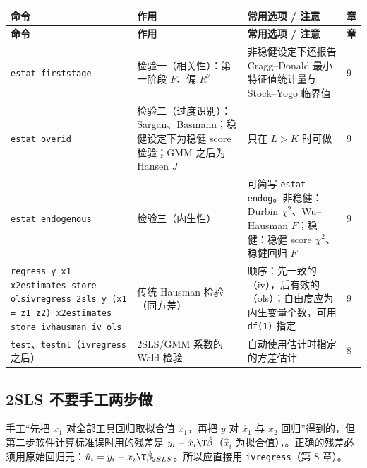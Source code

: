 {\renewcommand{\arraystretch}{1.12}\begin{longtable}{@{}>{\raggedright\arraybackslash\small}p{5.3cm}>{\raggedright\arraybackslash\small}p{3.8cm}>{\raggedright\arraybackslash\small}p{5.3cm}>{\centering\arraybackslash\small}p{0.9cm}@{}}
\toprule
\textbf{命令} & \textbf{作用} & \textbf{常用选项 / 注意} & \textbf{章}\\
\midrule
\endfirsthead
\toprule
\textbf{命令} & \textbf{作用} & \textbf{常用选项 / 注意} & \textbf{章}\\
\midrule
\endhead
\bottomrule
\endlastfoot

\texttt{estat firststage} & 检验一（相关性）：第一阶段 $F$、偏 $R^2$ & 非稳健设定下还报告 Cragg–Donald 最小特征值统计量与 Stock–Yogo 临界值 & 9\\
\addlinespace[1pt]
\texttt{estat overid} & 检验二（过度识别）：Sargan、Basmann；稳健设定下为稳健 score 检验；GMM 之后为 Hansen $J$ & 只在 $L>K$ 时可做 & 9\\
\addlinespace[1pt]
\texttt{estat endogenous} & 检验三（内生性） & 可简写 \texttt{estat endog}。非稳健：Durbin $\chi^2$、Wu–Hausman $F$；稳健：稳健 score $\chi^2$、稳健回归 $F$ & 9\\
\addlinespace[1pt]
\texttt{regress y x1 x2}\newline \texttt{estimates store ols}\newline \texttt{ivregress 2sls y (x1 = z1 z2) x2}\newline \texttt{estimates store iv}\newline \texttt{hausman iv ols} & 传统 Hausman 检验（同方差） & 顺序：先一致的（iv），后有效的（ols）；自由度应为内生变量个数，可用 \texttt{df(1)} 指定 & 9\\
\addlinespace[1pt]
\texttt{test}、\texttt{testnl}（\texttt{ivregress} 之后） & 2SLS/GMM 系数的 Wald 检验 & 自动使用估计时指定的方差估计 & 8\\
\end{longtable}}


\subsection{2SLS 不要手工两步做}

\begin{note}
手工“先把 $x_1$ 对全部工具回归取拟合值 $\hat x_1$，再把 $y$ 对 $\hat x_1$ 与 $x_2$ 回归”得到的，但第二步软件计算标准误时用的残差是 $y_i-\hat x_i\T\hat\beta$（$\hat x_i$ 为拟合值），。正确的残差必须用原始回归元：$\hat u_i=y_i-x_i\T\hat\beta_{2SLS}$。所以应直接用 \texttt{ivregress}（第 8 章）。
\end{note}

